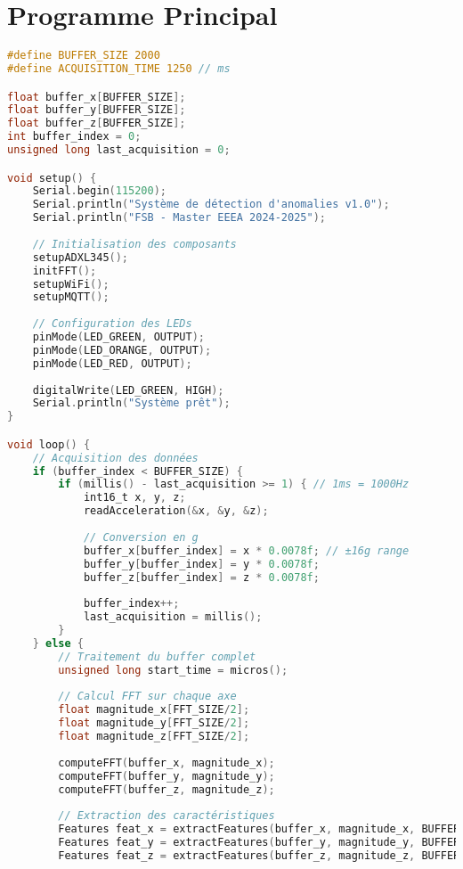 \section{Programme Principal}

\begin{lstlisting}[language=C, caption=Boucle principale du système]
#define BUFFER_SIZE 2000
#define ACQUISITION_TIME 1250 // ms

float buffer_x[BUFFER_SIZE];
float buffer_y[BUFFER_SIZE];
float buffer_z[BUFFER_SIZE];
int buffer_index = 0;
unsigned long last_acquisition = 0;

void setup() {
    Serial.begin(115200);
    Serial.println("Système de détection d'anomalies v1.0");
    Serial.println("FSB - Master EEEA 2024-2025");
    
    // Initialisation des composants
    setupADXL345();
    initFFT();
    setupWiFi();
    setupMQTT();
    
    // Configuration des LEDs
    pinMode(LED_GREEN, OUTPUT);
    pinMode(LED_ORANGE, OUTPUT);
    pinMode(LED_RED, OUTPUT);
    
    digitalWrite(LED_GREEN, HIGH);
    Serial.println("Système prêt");
}

void loop() {
    // Acquisition des données
    if (buffer_index < BUFFER_SIZE) {
        if (millis() - last_acquisition >= 1) { // 1ms = 1000Hz
            int16_t x, y, z;
            readAcceleration(&x, &y, &z);
            
            // Conversion en g
            buffer_x[buffer_index] = x * 0.0078f; // ±16g range
            buffer_y[buffer_index] = y * 0.0078f;
            buffer_z[buffer_index] = z * 0.0078f;
            
            buffer_index++;
            last_acquisition = millis();
        }
    } else {
        // Traitement du buffer complet
        unsigned long start_time = micros();
        
        // Calcul FFT sur chaque axe
        float magnitude_x[FFT_SIZE/2];
        float magnitude_y[FFT_SIZE/2];
        float magnitude_z[FFT_SIZE/2];
        
        computeFFT(buffer_x, magnitude_x);
        computeFFT(buffer_y, magnitude_y);
        computeFFT(buffer_z, magnitude_z);
        
        // Extraction des caractéristiques
        Features feat_x = extractFeatures(buffer_x, magnitude_x, BUFFER_SIZE);
        Features feat_y = extractFeatures(buffer_y, magnitude_y, BUFFER_SIZE);
        Features feat_z = extractFeatures(buffer_z, magnitude_z, BUFFER_SIZE);
        

\end{lstlisting}
